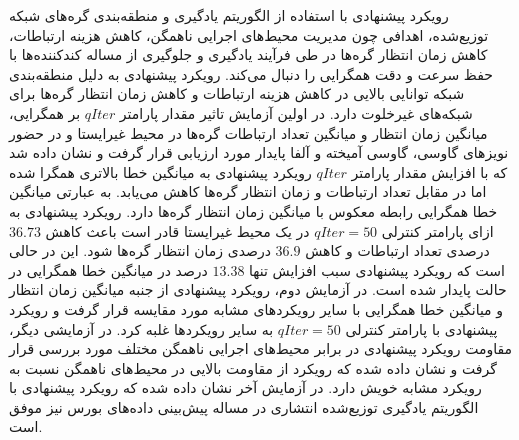 رویکرد پیشنهادی  با استفاده از الگوریتم‌ یادگیری  و منطقه‌بندی گره‌های شبکه توزیع‌شده، اهدافی چون مدیریت محیط‌های اجرایی ناهمگن، کاهش هزینه ارتباطات، کاهش زمان انتظار گره‌ها در طی فرآیند یادگیری و جلوگیری از مساله کندکننده‌ها با حفظ سرعت و دقت همگرایی را دنبال می‌کند. رویکرد پیشنهادی به دلیل منطقه‌بندی شبکه توانایی بالایی در کاهش هزینه ارتباطات و کاهش زمان انتظار گره‌ها برای شبکه‌های غیرخلوت دارد. در اولین آزمایش تاثیر مقدار پارامتر $qIter$ بر همگرایی، میانگین زمان انتظار و میانگین تعداد ارتباطات گره‌ها در محیط غیرایستا و در حضور نویزهای گاوسی، گاوسی آمیخته و آلفا پایدار مورد ارزیابی قرار گرفت و نشان داده شد که با افزایش مقدار پارامتر $qIter$ رویکرد پیشنهادی به میانگین خطا بالاتری همگرا شده اما در مقابل تعداد ارتباطات و زمان انتظار گره‌ها کاهش می‌یابد. به عبارتی میانگین خطا همگرایی رابطه معکوس با میانگین زمان انتظار گره‌ها دارد. رویکرد پیشنهادی به ازای پارامتر کنترلی $qIter=50$ در یک محیط غیرایستا قادر است باعث کاهش $36.73$ درصدی تعداد ارتباطات و کاهش $36.9$ درصدی زمان انتظار گره‌ها شود. این در حالی است که رویکرد پیشنهادی سبب افزایش تنها $13.38$ درصد در میانگین خطا همگرایی در حالت پایدار  شده است. در آزمایش دوم، رویکرد پیشنهادی از جنبه میانگین زمان انتظار و میانگین خطا همگرایی با سایر رویکردهای مشابه مورد مقایسه قرار گرفت و رویکرد پیشنهادی با پارامتر کنترلی $qIter=50$ به سایر رویکردها غلبه کرد. در آزمایشی دیگر، مقاومت رویکرد پیشنهادی در برابر محیط‌های اجرایی ناهمگن مختلف مورد بررسی قرار گرفت و نشان داده شده که رویکرد  از مقاومت بالایی در محیط‌های ناهمگن نسبت به رویکرد مشابه خویش  دارد. در آزمایش آخر نشان داده شده که رویکرد پیشنهادی با الگوریتم یادگیری توزیع‌شده انتشاری  در مساله پیش‌بینی داده‌های بورس نیز موفق است.

